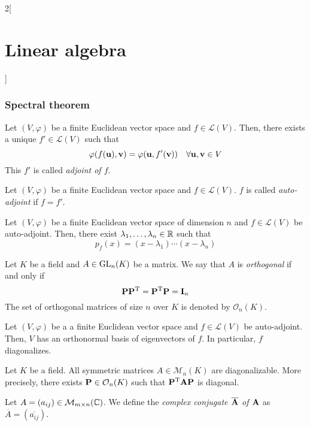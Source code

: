 \documentclass[../../../main.tex]{subfiles}
\begin{document}
\begin{multicols}{2}[\section{Linear algebra}]
  \subsubsection*{Spectral theorem}
  \begin{definition}
    Let $(V,\varphi)$ be a finite Euclidean vector space and $f\in\mathcal{L}(V)$. Then, there exists a unique $f'\in\mathcal{L}(V)$ such that $$\varphi(f(\vb{u}),\vb{v})=\varphi(\vb{u},f'(\vb{v}))\quad\forall \vb{u},\vb{v}\in V$$ This $f'$ is called \textit{adjoint of $f$}.
  \end{definition}
  \begin{definition}
    Let $(V,\varphi)$ be a finite Euclidean vector space and $f\in\mathcal{L}(V)$. $f$ is called \textit{auto-adjoint} if $f=f'$.
  \end{definition}
  \begin{lemma}
    Let $(V,\varphi)$ be a finite Euclidean vector space of dimension $n$ and $f\in\mathcal{L}(V)$ be auto-adjoint. Then, there exist $\lambda_1,\ldots,\lambda_n\in\mathbb{R}$ such that $$p_f(x)=(x-\lambda_1 )\cdots(x-\lambda_n)$$
  \end{lemma}
  \begin{definition}
    Let $K$ be a field and $A\in\mathrm{GL}_n(K)$ be a matrix. We say that $A$ is \textit{orthogonal} if and only if $$\vb{P}\vb{P}^{\mathrm{T}}=\vb{P}^{\mathrm{T}}\vb{P}=\vb{I}_n$$ The set of orthogonal matrices of size $n$ over $K$ is denoted by $\mathcal{O}_n(K)$.
  \end{definition}
  \begin{theorem}
    Let $(V,\varphi)$ be a a finite Euclidean vector space and $f\in\mathcal{L}(V)$ be auto-adjoint. Then, $V$ has an orthonormal basis of eigenvectors of $f$. In particular, $f$ diagonalizes.
  \end{theorem}
  \begin{corollary}
    Let $K$ be a field. All symmetric matrices $A\in\mathcal{M}_n(K)$ are diagonalizable. More precisely, there exists $\vb{P}\in\mathcal{O}_n(K)$ such that $\vb{P}^{\mathrm{T}}\vb{A}\vb{P}$ is diagonal.
  \end{corollary}
  \begin{definition}
    Let $A=(a_{ij})\in\mathcal{M}_{m\times n}(\mathbb{C})$. We define the \textit{complex conjugate $\overline{\vb{A}}$ of $\vb{A}$} as $\overline{A}=(\overline{a_{ij}})$.
  \end{definition}
  \begin{prop}

\end{prop}
\end{multicols}
\end{document}
